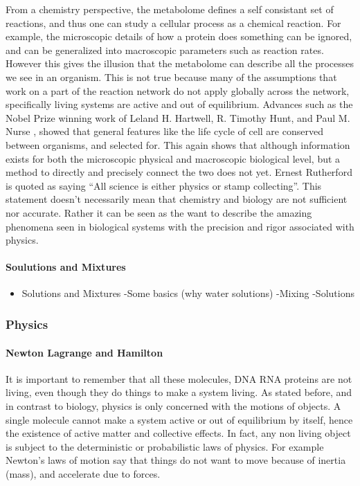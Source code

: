 \documentclass{article}
\begin{document}
From a chemistry perspective, the metabolome defines a self consistant set of reactions, and thus one can study a cellular process as a chemical reaction. For example, the microscopic details of how a protein does something can be ignored, and can be generalized into macroscopic parameters such as reaction rates. However this gives the illusion that the metabolome can describe all the processes we see in an organism. This is not true because many of the assumptions that work on a part of the reaction network do not apply globally across the network, specifically living systems are active and out of equilibrium. Advances such as the Nobel Prize winning work of Leland H. Hartwell, R. Timothy Hunt, and Paul M. Nurse , showed that general features like the life cycle of cell are conserved between organisms, and selected for. This again shows that although information exists for both the microscopic physical and macroscopic biological level, but a method to directly and precisely connect the two does not yet. Ernest Rutherford is quoted as saying ``All science is either physics or stamp collecting''. This statement doesn't necessarily mean that chemistry and biology are not sufficient nor accurate. Rather it can be seen as the want to describe the amazing phenomena seen in biological systems with the precision and rigor associated with physics.

\paragraph{Soulutions and Mixtures}

\begin{itemize}
\item Solutions and Mixtures \newline
-Some basics (why water solutions)\newline
-Mixing\newline
-Solutions
\end{itemize}

\subsubsection{Physics}

\paragraph{Newton Lagrange and Hamilton}

It is important to remember that all these molecules, DNA RNA proteins are not living, even though they do things to make a system living. As stated before, and in contrast to biology, physics is only concerned with the motions of objects. A single molecule cannot make a system active or out of equilibrium by itself, hence the existence of active matter and collective effects. In fact, any non living object is subject to the deterministic or probabilistic laws of physics. For example Newton's laws of motion say that things do not want to move because of inertia (mass), and accelerate due to forces.
\end{document}
